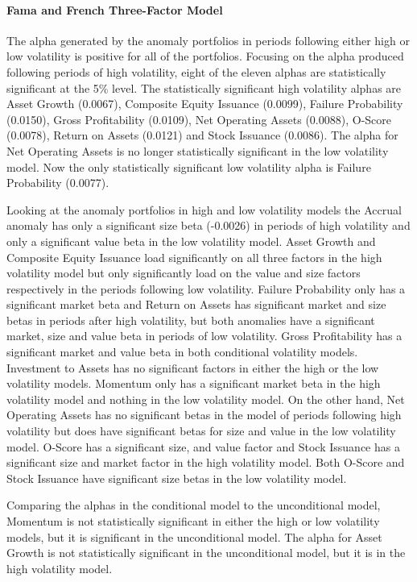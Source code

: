 \documentclass[a4paper]{article}                 %
\begin{document}
\paragraph{Fama and French Three-Factor Model}
The alpha generated by the anomaly portfolios in periods following either high or low volatility is positive for all of the portfolios. Focusing on the alpha produced following periods of high volatility, eight of the eleven alphas are statistically significant at the 5\% level. The statistically significant high volatility alphas are Asset Growth (0.0067), Composite Equity Issuance (0.0099), Failure Probability (0.0150), Gross Profitability (0.0109), Net Operating Assets (0.0088), O-Score (0.0078), Return on Assets (0.0121) and Stock Issuance (0.0086). The alpha for Net Operating Assets is no longer statistically significant in the low volatility model. Now the only statistically significant low volatility alpha is Failure Probability (0.0077). 

Looking at the anomaly portfolios in high and low volatility models the Accrual anomaly has only a significant size beta (-0.0026) in periods of high volatility and only a significant value beta in the low volatility model. Asset Growth and Composite Equity Issuance load significantly on all three factors in the high volatility model but only significantly load on the value and size factors respectively in the periods following low volatility. Failure Probability only has a significant market beta and Return on Assets has significant market and size betas in periods after high volatility, but both anomalies have a significant market, size and value beta in periods of low volatility. Gross Profitability has a significant market and value beta in both conditional volatility models. Investment to Assets has no significant factors in either the high or the low volatility models. Momentum only has a significant market beta in the high volatility model and nothing in the low volatility model. On the other hand, Net Operating Assets has no significant betas in the model of periods following high volatility but does have significant betas for size and value in the low volatility model. O-Score has a significant size, and value factor and Stock Issuance has a significant size and market factor in the high volatility model. Both O-Score and Stock Issuance have significant size betas in the low volatility model.

Comparing the alphas in the conditional model to the unconditional model, Momentum is not statistically significant in either the high or low volatility models, but it is significant in the unconditional model. The alpha for Asset Growth is not statistically significant in the unconditional model, but it is in the high volatility model.
\end{document}
